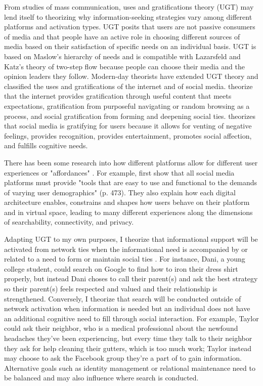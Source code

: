 From studies of mass communication, uses and gratifications theory (UGT)
\citep{blumlerUsesMassCommunications1974, tanMassCommunicationTheories1985} may
lend itself to theorizing why information-seeking strategies vary among
different platforms and activation types. UGT posits that users are not passive
consumers of media and that people have an active role in choosing different
sources of media based on their satisfaction of specific needs on an individual
basis. UGT is based on Maslow's \citeyearpar{maslowTheoryHumanMotivation1943}
hierarchy of needs and is compatible with Lazarsfeld and Katz's theory of
two-step flow because people can choose their media and the opinion leaders they
follow. Modern-day theorists have extended UGT theory and classified the uses
and gratifications of the internet and of social media.
\citet{staffordDeterminingUsesGratifications2004} theorize that the internet
provides gratification through useful content that meets expectations,
gratification from purposeful navigating or random browsing as a process, and
social gratification from forming and deepening social ties.
\citet{leungGenerationalDifferencesContent2013} theorizes that social media is
gratifying for users because it allows for venting of negative feelings,
provides recognition, provides entertainment, promotes social affection, and
fulfills cognitive needs.

There has been some research into how different platforms allow for different
user experiences or "affordances" \citep{boyd2010social}. For example,
\citet{bossetta18} first show that all social media platforms must provide
"tools that are easy to use and functional to the demands of varying user
demographics" (p. 473). They also explain how each digital architecture enables,
constrains and shapes how users behave on their platform and in virtual space,
leading to many different experiences along the dimensions of searchability,
connectivity, and privacy.

Adapting UGT to my own purposes, I theorize that informational support will be
activated from network ties when the informational need is accompanied by or
related to a need to form or maintain social ties
\citep{baumeister,grieve2013face}. For instance, Dani, a young college student,
could search on Google to find how to iron their dress shirt properly, but
instead Dani choses to call their parent(s) and ask the best strategy so their
parent(s) feels respected and valued and their relationship is strengthened.
Conversely, I theorize that search will be conducted outside of network
activation when information is needed but an individual does not have an
additional cognitive need to fill through social interaction. For example,
Taylor could ask their neighbor, who is a medical professional about the
newfound headaches they've been experiencing, but every time they talk to their
neighbor they ask for help cleaning their gutters, which is too much work;
Taylor instead may choose to ask the Facebook group they're a part of to gain
information. Alternative goals such as identity management or relational
maintenance \citep{brashersInformationSeekingAvoiding2002} need to be balanced
and may also influence where search is conducted.

